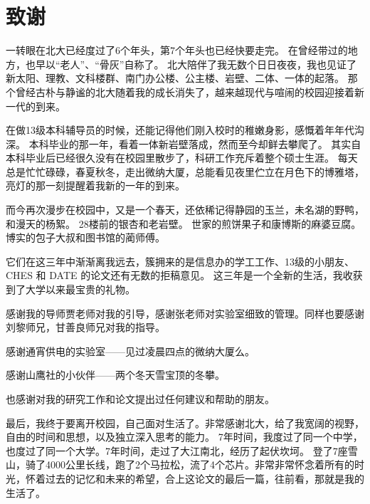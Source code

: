 
\chapter{致谢}
一转眼在北大已经度过了6个年头，第7个年头也已经快要走完。
在曾经带过的地方，也早以``老人''、``骨灰''自称了。
北大陪伴了我无数个日日夜夜，我也见证了新太阳、理教、文科楼群、南门办公楼、公主楼、岩壁、二体、一体的起落。
那个曾经古朴与静谧的北大随着我的成长消失了，越来越现代与喧闹的校园迎接着新一代的到来。

在做13级本科辅导员的时候，还能记得他们刚入校时的稚嫩身影，感慨着年年代沟深。
本科毕业的那一年，看着一体新岩壁落成，然而至今却鲜去攀爬了。
其实自本科毕业后已经很久没有在校园里散步了，科研工作充斥着整个硕士生涯。
每天总是忙忙碌碌，春夏秋冬，走出微纳大厦，总能看见夜里伫立在月色下的博雅塔，亮灯的那一刻提醒着我新的一年的到来。

而今再次漫步在校园中，又是一个春天，还依稀记得静园的玉兰，未名湖的野鸭，和漫天的杨絮。
28楼前的银杏和老岩壁。
世家的煎饼果子和康博斯的麻婆豆腐。
博实的包子大叔和图书馆的蔺师傅。

它们在这三年中渐渐离我远去，簇拥来的是信息办的学工工作、13级的小朋友、CHES 和 DATE 的论文还有无数的拒稿意见。
这三年是一个全新的生活，我收获到了大学以来最宝贵的礼物。

感谢我的导师贾老师对我的引导，感谢张老师对实验室细致的管理。同样也要感谢刘黎师兄，甘善良师兄对我的指导。

感谢通宵供电的实验室——见过凌晨四点的微纳大厦么。

感谢山鹰社的小伙伴——两个冬天雪宝顶的冬攀。

也感谢对我的研究工作和论文提出过任何建议和帮助的朋友。

最后，我终于要离开校园，自己面对生活了。非常感谢北大，给了我宽阔的视野，自由的时间和思想，以及独立深入思考的能力。
7年时间，我度过了同一个中学，也度过了同一个大学。7年时间，走过了大江南北，经历了起伏坎坷。
登了7座雪山，骑了4000公里长线，跑了2个马拉松，流了4个芯片。非常非常怀念着所有的时光，怀着过去的记忆和未来的希望，合上这论文的最后一篇，往前看，那就是我的生活了。

